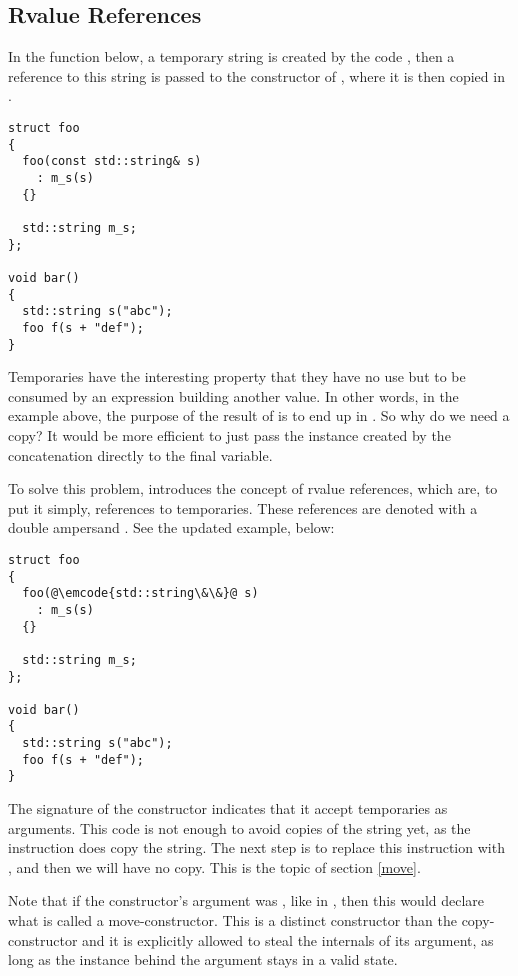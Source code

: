 \subsection{Rvalue References}

In the function  below, a temporary string is created by
the code , then a reference to this string is passed
to the constructor of , where it is then copied in
.

\begin{lstlisting}
struct foo
{
  foo(const std::string& s)
    : m_s(s)
  {}

  std::string m_s;
};

void bar()
{
  std::string s("abc");
  foo f(s + "def");
}
\end{lstlisting}

Temporaries have the interesting property that they have no use but to
be consumed by an expression building another value. In other words,
in the example above, the purpose of the result of  is
to end up in . So why do we need a copy? It would be
more efficient to just pass the instance created by the concatenation
directly to the final variable.

To solve this problem,  introduces the concept of rvalue
references, which are, to put it simply, references to
temporaries. These references are denoted with a double ampersand
\code{\&\&}. See the updated example, below:

\begin{lstlisting}
struct foo
{
  foo(@\emcode{std::string\&\&}@ s)
    : m_s(s)
  {}

  std::string m_s;
};

void bar()
{
  std::string s("abc");
  foo f(s + "def");
}
\end{lstlisting}

The signature of the constructor indicates that it accept temporaries
as arguments. This code is not enough to avoid copies of the string
yet, as the instruction  does copy the string. The next
step is to replace this instruction with ,
and then we will have no copy. This is the topic of section
\ref{move}.

Note that if the constructor's argument was , like in
, then this would declare what is called a
move-constructor. This is a distinct constructor than the
copy-constructor and it is explicitly allowed to steal the internals
of its argument, as long as the instance behind the argument stays in
a valid state.

